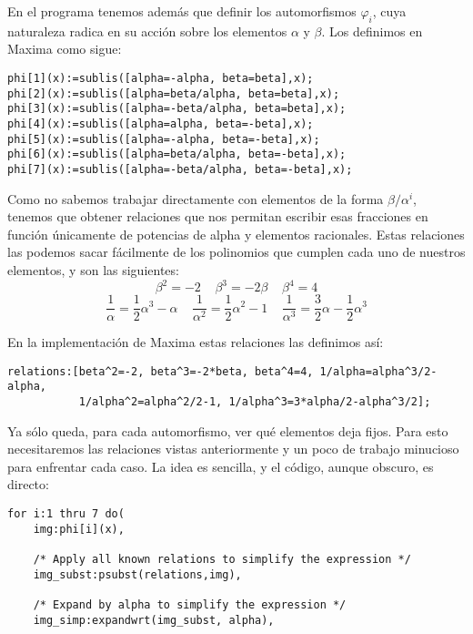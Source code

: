\documentclass[a4paper, 11pt]{article}
\begin{document}
\begin{solucion}
      En el programa tenemos además que definir los automorfismos $\varphi_i$, cuya naturaleza radica en su acción sobre los elementos $\alpha$ y $\beta$. Los definimos en Maxima como sigue:

      \color{blue}
      \begin{verbatim}
phi[1](x):=sublis([alpha=-alpha, beta=beta],x);
phi[2](x):=sublis([alpha=beta/alpha, beta=beta],x);
phi[3](x):=sublis([alpha=-beta/alpha, beta=beta],x);
phi[4](x):=sublis([alpha=alpha, beta=-beta],x);
phi[5](x):=sublis([alpha=-alpha, beta=-beta],x);
phi[6](x):=sublis([alpha=beta/alpha, beta=-beta],x);
phi[7](x):=sublis([alpha=-beta/alpha, beta=-beta],x);
      \end{verbatim}
      \color{black}

      Como no sabemos trabajar directamente con elementos de la forma $\beta/\alpha^i$, tenemos que obtener relaciones que nos permitan escribir esas fracciones en función únicamente de potencias de alpha y elementos racionales. Estas relaciones las podemos sacar fácilmente de los polinomios que cumplen cada uno de nuestros elementos, y son las siguientes:
      \[
          \beta^2=-2 \;\;\;\; \beta^3=-2\beta \;\;\;\; \beta^4=4
      \]
      \[
          \frac{1}{\alpha}=\frac{1}{2}\alpha^3-\alpha \;\;\;\; \frac{1}{\alpha^2}=\frac{1}{2}\alpha^2-1 \;\;\;\; \frac{1}{\alpha^3}=\frac{3}{2}\alpha-\frac{1}{2}\alpha^3
      \]

      En la implementación de Maxima estas relaciones las definimos así:

      \color{blue}
      \begin{verbatim}
relations:[beta^2=-2, beta^3=-2*beta, beta^4=4, 1/alpha=alpha^3/2-alpha,
           1/alpha^2=alpha^2/2-1, 1/alpha^3=3*alpha/2-alpha^3/2];
      \end{verbatim}
      \color{black}

      Ya sólo queda, para cada automorfismo, ver qué elementos deja fijos. Para esto necesitaremos las relaciones vistas anteriormente y un poco de trabajo minucioso para enfrentar cada caso. La idea es sencilla, y el código, aunque obscuro, es directo:

      \color{blue}
      \begin{verbatim}
for i:1 thru 7 do(
    img:phi[i](x),

    /* Apply all known relations to simplify the expression */
    img_subst:psubst(relations,img),

    /* Expand by alpha to simplify the expression */
    img_simp:expandwrt(img_subst, alpha),


\end{verbatim}
\end{solucion}
\end{document}
